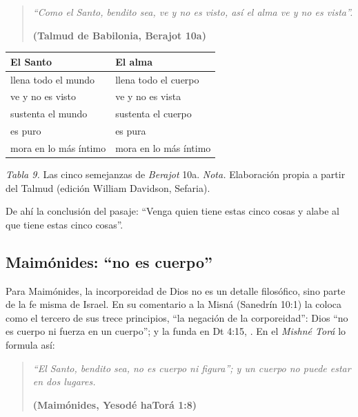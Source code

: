 \begin{quote}\itshape
``Como el Santo, bendito sea, ve y no es visto, así el alma ve y no es vista''.\par\hfill{\upshape\small\bfseries\textcolor{azul}{(Talmud de Babilonia, Berajot 10a)}}
\end{quote}

\begin{center}\small\renewcommand{\arraystretch}{1.2}
\begin{tabular}{@{}L{5.6cm}L{5.6cm}@{}}
\toprule
\textbf{El Santo} & \textbf{El alma} \\ \midrule
llena todo el mundo & llena todo el cuerpo \\
ve y no es visto & ve y no es vista \\
sustenta el mundo & sustenta el cuerpo \\
es puro & es pura \\
mora en lo más íntimo & mora en lo más íntimo \\
\bottomrule
\end{tabular}\par
{\footnotesize\color{gris}\textit{Tabla 9.} Las cinco semejanzas de \emph{Berajot} 10a. \textit{Nota.} Elaboración propia a partir del Talmud (edición William Davidson, Sefaria).}
\end{center}

De ahí la conclusión del pasaje: ``Venga quien tiene estas cinco cosas y alabe al que tiene estas cinco cosas''.


\subsection{Maimónides: “no es cuerpo”}

Para Maimónides, la incorporeidad de Dios no es un detalle filosófico, sino parte de la fe misma de Israel. En su comentario a la Misná (Sanedrín 10:1) la coloca como el tercero de sus trece principios, ``la negación de la corporeidad'': Dios ``no es cuerpo ni fuerza en un cuerpo''; y la funda en Dt 4:15, . En el \emph{Mishné Torá} lo formula así:

\begin{quote}\itshape
``El Santo, bendito sea, no es cuerpo ni figura''; y un cuerpo no puede estar en dos lugares.\par\hfill{\upshape\small\bfseries\textcolor{azul}{(Maimónides, Yesodé haTorá 1:8)}}
\end{quote}

